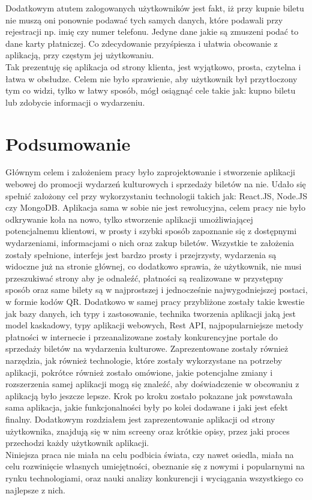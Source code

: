 \documentclass[12pt]{article}
\begin{document}
\begin{sloppypar}
{\begin{figure}[H]
    \label{fig:purchase_his}
  \end{figure}
  Dodatkowym atutem zalogowanych użytkowników jest fakt, iż przy kupnie biletu nie muszą oni ponownie podawać tych samych danych, które podawali przy rejestracji np. imię czy numer telefonu. 
  Jedyne dane jakie są zmuszeni podać to dane karty płatniczej. Co zdecydowanie przyśpiesza i ułatwia obcowanie z aplikacją, przy częstym jej użytkowaniu.\\
  Tak prezentuję się aplikacja od strony klienta, jest wyjątkowo, prosta, czytelna i łatwa w obsłudze. 
  Celem nie było sprawienie, aby użytkownik był przytłoczony tym co widzi, tylko w łatwy sposób, mógł osiągnąć cele takie jak: kupno biletu lub zdobycie informacji o wydarzeniu.
}

\section{Podsumowanie}
{
  Głównym celem i założeniem pracy było zaprojektowanie i stworzenie aplikacji webowej do promocji wydarzeń kulturowych i sprzedaży biletów na nie. 
  Udało się spełnić założony cel przy wykorzystaniu technologii takich jak: React.JS, Node.JS czy MongoDB. 
  Aplikacja sama w sobie nie jest rewolucyjna, celem pracy nie było odkrywanie koła na nowo, 
  tylko stworzenie aplikacji umożliwiającej potencjalnemu klientowi, w prosty i szybki sposób zapoznanie się z dostępnymi wydarzeniami, informacjami o nich oraz zakup biletów. 
  Wszystkie te założenia zostały spełnione, interfejs jest bardzo prosty i przejrzysty, wydarzenia są widoczne już na stronie głównej, 
  co dodatkowo sprawia, że użytkownik, nie musi przeszukiwać strony aby je odnaleźć, 
  płatności są realizowane w przystępny sposób oraz same bilety są w najprostszej i jednocześnie najwygodniejszej postaci, w formie kodów QR. 
  Dodatkowo w samej pracy przybliżone zostały takie kwestie jak bazy danych, ich typy i zastosowanie, technika tworzenia aplikacji jaką jest model kaskadowy, typy aplikacji webowych, Rest API,
  najpopularniejsze metody płatności w internecie i przeanalizowane zostały konkurencyjne portale do sprzedaży biletów na wydarzenia kulturowe. 
  Zaprezentowane zostały również narzędzia, jak również technologie, które zostały wykorzystane na potrzeby aplikacji, pokrótce również zostało omówione, 
  jakie potencjalne zmiany i rozszerzenia samej aplikacji mogą się znaleźć, aby doświadczenie w obcowaniu z aplikacją było jeszcze lepsze. 
  Krok po kroku zostało pokazane jak powstawała sama aplikacja, jakie funkcjonalności były po kolei dodawane i jaki jest efekt finalny. 
  Dodatkowym rozdziałem jest zaprezentowanie aplikacji od strony użytkownika, znajdują się w nim screeny oraz krótkie opisy, przez jaki proces przechodzi każdy użytkownik aplikacji.\\
  Niniejsza praca nie miała na celu podbicia świata, czy nawet osiedla, miała na celu rozwinięcie własnych umiejętności, 
  obeznanie się z nowymi i popularnymi na rynku technologiami, oraz nauki analizy konkurencji i wyciągania wszystkiego co najlepsze z nich.
}


\end{sloppypar}
\end{document}

